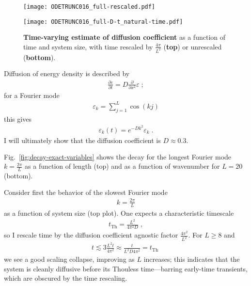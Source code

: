 \documentclass[aps,prb,nofootinbib,twocolumn,balancelastpage,amsmath,amssymb,floatfix,superscriptaddress,]{revtex4-1}
\begin{document}
\begin{figure}[t!]
  \begin{minipage}{0.45\textwidth}
    \texttt{[image: ODETRUNC016\_full-rescaled.pdf]}
  \end{minipage}

  
  \begin{minipage}{0.45\textwidth}
    \texttt{[image: ODETRUNC016\_full-D-t\_natural-time.pdf]}
  \end{minipage}

  \caption{
    \textbf{Time-varying estimate of diffusion coefficient}
    as a function of time and system size, with time rescaled by $\frac {4\pi}{L^2}$ (\textbf{top}) or unrescaled (\textbf{bottom}). 
  }
  \label{fig:diff-time}
\end{figure}



Diffusion of energy density is described by
\begin{align}
  \frac{\partial \varepsilon}{\partial t} = D \frac{\partial}{\partial x^2} \varepsilon\;;
\end{align}
for a Fourier mode
\begin{align}
  \label{eq:cosine-mode-app}
  \varepsilon_{k} = \sum_{j = 1}^L \cos(kj)
\end{align}
this gives
\begin{align}
  \label{eq:decay}
  \varepsilon_k(t) = e^{-Dk^2} \varepsilon_k\;.
\end{align}
I will ultimately show that the diffusion coefficient is $D \approx 0.3$.

Fig.~\ref{fig:decay-exact-variables} shows the decay
for the longest Fourier mode $k = \frac{2\pi}{L}$ as a function of length (top)
and as a function of wavenumber for $L = 20$ (bottom).

Consider first the behavior of the slowest Fourier mode
\begin{align}
  k = \frac {2\pi}{L}
\end{align}
as a function of system size (top plot).
One expects a characteristic timescale
\begin{align}
  t_{\mathrm{Th}} = \frac  {L^2}{4\pi^2D}\;,
\end{align}
so I rescale time by the diffusion coefficient agnostic factor $\frac{4\pi^2}{L^2}$.
For $L \ge 8$ and
\begin{align}
  t \lesssim 3 \frac{L^2t}{4\pi^2} \approx \frac{t}{L^2D4\pi^2 } = t_{\mathrm{Th}}\;
\end{align}
we see a good scaling collapse, improving as $L$ increases; this indicates that
the system is cleanly diffusive before its Thouless time---barring early-time transients,
which are obscured by the time rescaling.
\end{document}
